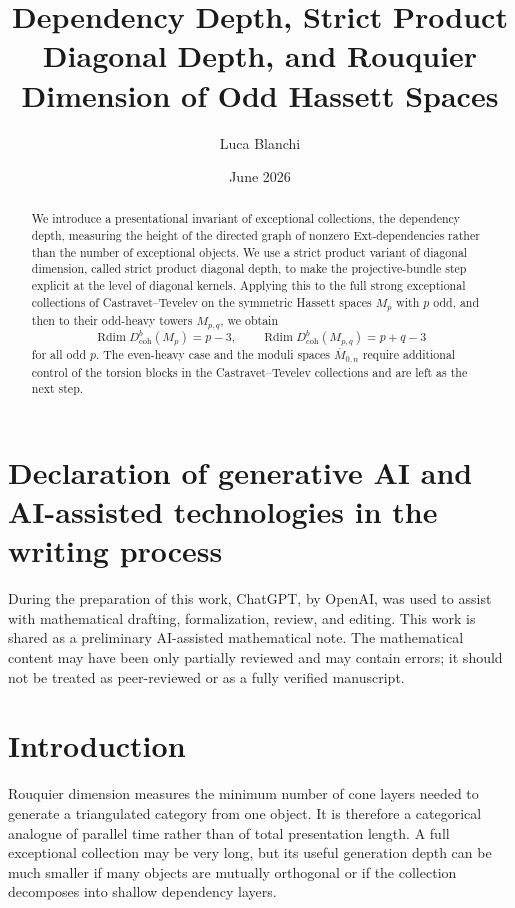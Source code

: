\documentclass[11pt]{amsart}
\numberwithin{equation}{section}
\theoremstyle{definition}
\DeclareMathOperator{\Rdim}{Rdim}
\newcommand{\Db}{D^b_{\mathrm{coh}}}
\begin{document}
\title[Dependency depth and odd Hassett spaces]{Dependency Depth, Strict Product Diagonal Depth, and Rouquier Dimension of Odd Hassett Spaces}
\author{Luca Blanchi}
\date{June 2026}
\begin{abstract}
We introduce a presentational invariant of exceptional collections, the dependency depth, measuring the height of the directed graph of nonzero Ext-dependencies rather than the number of exceptional objects. We use a strict product variant of diagonal dimension, called strict product diagonal depth, to make the projective-bundle step explicit at the level of diagonal kernels. Applying this to the full strong exceptional collections of Castravet--Tevelev on the symmetric Hassett spaces $M_p$ with $p$ odd, and then to their odd-heavy towers $M_{p,q}$, we obtain
\[
\Rdim \Db(M_p)=p-3,
\qquad
\Rdim \Db(M_{p,q})=p+q-3
\]
for all odd $p$. The even-heavy case and the moduli spaces $\overline M_{0,n}$ require additional control of the torsion blocks in the Castravet--Tevelev collections and are left as the next step.
\end{abstract}
\maketitle

\section*{Declaration of generative AI and AI-assisted technologies in the writing process}
During the preparation of this work, ChatGPT, by OpenAI, was used to assist with mathematical drafting, formalization, review, and editing. This work is shared as a preliminary AI-assisted mathematical note. The mathematical content may have been only partially reviewed and may contain errors; it should not be treated as peer-reviewed or as a fully verified manuscript.

\section{Introduction}

Rouquier dimension measures the minimum number of cone layers needed to generate a triangulated category from one object. It is therefore a categorical analogue of parallel time rather than of total presentation length. A full exceptional collection may be very long, but its useful generation depth can be much smaller if many objects are mutually orthogonal or if the collection decomposes into shallow dependency layers.
\end{document}
